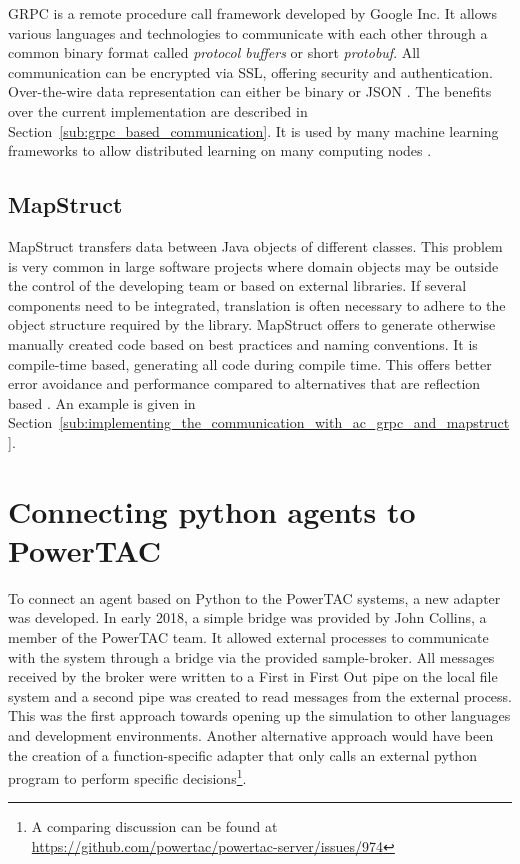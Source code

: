 \acf {GRPC} is a remote procedure call framework developed by Google Inc. It allows various languages and technologies to
communicate with each other through a common binary format called \emph{protocol buffers} or short \emph{protobuf}. All
communication can be encrypted via \ac{SSL}, offering
security and authentication. Over-the-wire data representation can either be binary or \ac{JSON}
\citep[]{grpc}. The benefits over the
current implementation are described in Section~\ref{sub:grpc_based_communication}. It is used by many machine learning
frameworks to allow distributed learning on many computing nodes \cite[]{tensorflow2015-whitepaper}.


\subsection{MapStruct}%
\label{sub:mapstruct}

MapStruct transfers data between Java objects of different classes. This problem is very common in large
software projects where domain objects may be outside the control of the developing team or based on external libraries.
If several components need to be integrated, translation is often necessary to adhere to the object structure required
by the library. MapStruct offers to generate otherwise manually created code based on best practices and naming
conventions. It is compile-time based, generating all code during compile time. This offers better error avoidance and
performance compared to alternatives that are reflection based
\citep[]{mapstruct}.
An example is given in Section~\ref{sub:implementing_the_communication_with_ac_grpc_and_mapstruct}.





\section{Connecting python agents to PowerTAC}%
\label{sec:connecting_python_agents_to_powertac}



To connect an agent based on Python to the \ac{PowerTAC} systems, a new adapter was developed. In early 2018, a simple bridge
was provided by John Collins, a member of the \ac{PowerTAC} team. It allowed external processes to communicate with the
system through a bridge via the provided sample-broker. All messages received by the broker were written to a First in
First Out pipe on the local file system and a second pipe was created to read messages from the external process. This
was the first approach towards opening up the simulation to other languages and development environments. Another
alternative approach would have been the creation of a function-specific adapter that only calls an external python
program to perform specific decisions\footnote{A comparing discussion can be found at
\url{https://github.com/powertac/powertac-server/issues/974}}.

